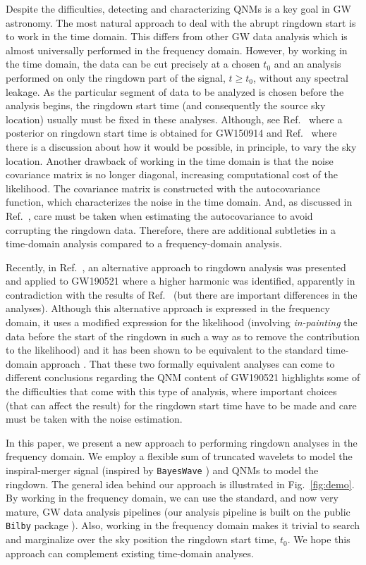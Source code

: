 Despite the difficulties, detecting and characterizing QNMs is a key goal in GW astronomy. 
The most natural approach to deal with the abrupt ringdown start is to work in the time domain. 
This differs from other GW data analysis which is almost universally performed in the frequency domain. 
However, by working in the time domain, the data can be cut precisely at a chosen $t_0$ and an analysis performed on only the ringdown part of the signal, $t \geq t_0$, without any spectral leakage.
As the particular segment of data to be analyzed is chosen before the analysis begins, the ringdown start time (and consequently the source sky location) usually must be fixed in these analyses. 
Although, see Ref.~\cite{Carullo:2019flw} where a posterior on ringdown start time is obtained for GW150914 and Ref.~\cite{Isi:2021iql} where there is a discussion about how it would be possible, in principle, to vary the sky location.
Another drawback of working in the time domain is that the noise covariance matrix is no longer diagonal, increasing computational cost of the likelihood. 
The covariance matrix is constructed with the autocovariance function, which characterizes the noise in the time domain.
And, as discussed in Ref.~\cite{Isi:2021iql}, care must be taken when estimating the autocovariance to avoid corrupting the ringdown data. Therefore, there are additional subtleties in a time-domain analysis compared to a frequency-domain analysis.

Recently, in Ref.~\cite{Capano:2021etf}, an alternative approach to ringdown analysis was presented and applied to GW190521 where a higher harmonic was identified, apparently in contradiction with the results of Ref.~\cite{LIGOScientific:2020tif} (but there are important differences in the analyses). 
Although this alternative approach is expressed in the frequency domain, it uses a modified expression for the likelihood (involving \emph{in-painting} the data before the start of the ringdown in such a way as to remove the contribution to the likelihood) and it has been shown to be equivalent to the standard time-domain approach \cite{Isi:2021iql}.
That these two formally equivalent analyses \cite{LIGOScientific:2020tif, Capano:2021etf} can come to different conclusions regarding the QNM content of GW190521 highlights some of the difficulties that come with this type of analysis, where important choices (that can affect the result) for the ringdown start time have to be made and care must be taken with the noise estimation.

In this paper, we present a new approach to performing ringdown analyses in the frequency domain. 
We employ a flexible sum of truncated wavelets to model the inspiral-merger signal (inspired by \texttt{BayesWave} \cite{Cornish:2014kda, Cornish:2020dwh}) and QNMs to model the ringdown.
The general idea behind our approach is illustrated in Fig.~\ref{fig:demo}.
By working in the frequency domain, we can use the standard, and now very mature, GW data analysis pipelines (our analysis pipeline is built on the public \texttt{Bilby} package \cite{Ashton:2018jfp}).
Also, working in the frequency domain makes it trivial to search and marginalize over the sky position the ringdown start time, $t_0$. 
We hope this approach can complement existing time-domain analyses.

